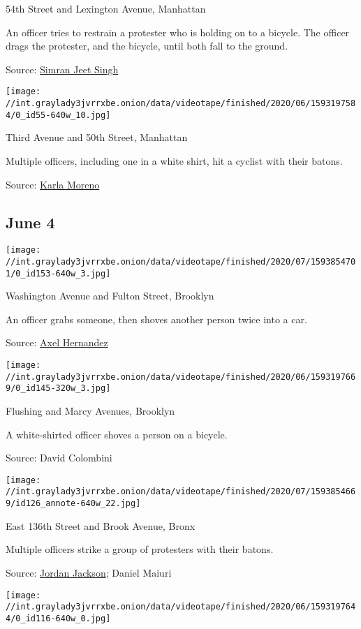  54th Street and Lexington Avenue, Manhattan

 An officer tries to restrain a protester who is holding on to a
bicycle. The officer drags the protester, and the bicycle, until both
fall to the ground.

Source:
\href{https://twitter.com/SikhProf/status/1268350274424508417}{Simran
Jeet Singh}

\texttt{[image: //int.graylady3jvrrxbe.onion/data/videotape/finished/2020/06/1593197584/0\_id55-640w\_10.jpg]}

 Third Avenue and 50th Street, Manhattan

 Multiple officers, including one in a white shirt, hit a cyclist with
their batons.

Source:
\href{https://twitter.com/joshfoxfilm/status/1268366550475603969}{Karla
Moreno}

\hypertarget{june-4}{%
\subsection{June 4}\label{june-4}}

\texttt{[image: //int.graylady3jvrrxbe.onion/data/videotape/finished/2020/07/1593854701/0\_id153-640w\_3.jpg]}

 Washington Avenue and Fulton Street, Brooklyn

 An officer grabs someone, then shoves another person twice into a car.

Source:
\href{https://twitter.com/Axelohh/status/1268750326150111232}{Axel
Hernandez}

\texttt{[image: //int.graylady3jvrrxbe.onion/data/videotape/finished/2020/06/1593197669/0\_id145-320w\_3.jpg]}

 Flushing and Marcy Avenues, Brooklyn

 A white-shirted officer shoves a person on a bicycle.

Source: David Colombini

\texttt{[image: //int.graylady3jvrrxbe.onion/data/videotape/finished/2020/07/1593854669/id126\_annote-640w\_22.jpg]}

 East 136th Street and Brook Avenue, Bronx

 Multiple officers strike a group of protesters with their batons.

Source:
\href{https://twitter.com/ghouldisco/status/1268872802708357122}{Jordan
Jackson}; Daniel Maiuri

\texttt{[image: //int.graylady3jvrrxbe.onion/data/videotape/finished/2020/06/1593197644/0\_id116-640w\_0.jpg]}

